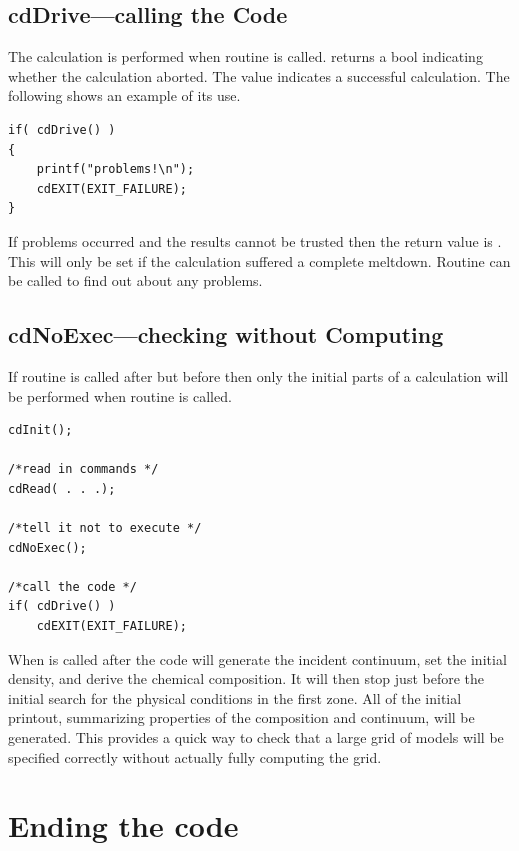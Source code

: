 \subsection{cdDrive---calling the Code}

The calculation is performed when routine  is called.
returns a bool indicating whether the calculation aborted.
The value
 indicates a successful calculation.
The following shows an example of
its use.
\begin{verbatim}
if( cdDrive() )
{
    printf("problems!\n");
    cdEXIT(EXIT_FAILURE);
}
\end{verbatim}

If problems occurred and the results cannot be trusted then the return
value is .  This will only be set if the calculation suffered a
complete meltdown.  Routine  can be called to
find out about any problems.

\subsection{cdNoExec---checking without Computing}

If routine  is called after 
but before  then only
the initial parts of a calculation will be performed when routine
is called.
\begin{verbatim}
cdInit();

/*read in commands */
cdRead( . . .);

/*tell it not to execute */
cdNoExec();

/*call the code */
if( cdDrive() )
    cdEXIT(EXIT_FAILURE);
\end{verbatim}

When  is called after  the code will generate the incident
continuum, set the initial density, and derive the chemical composition.
It will then stop just before the initial search for the physical conditions
in the first zone.  All of the initial printout, summarizing properties
of the composition and continuum, will be generated.  This provides a quick
way to check that a large grid of models will be specified correctly without
actually fully computing the grid.

\section{Ending the code}

